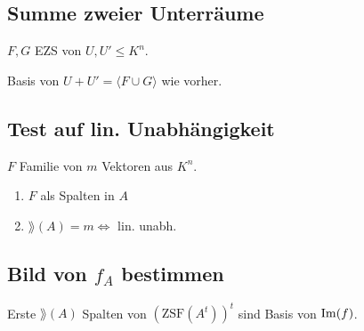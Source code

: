 \subsection*{Summe zweier Unterräume}
$F,G$ EZS von $U,U' \le K^n$.

Basis von $U+U'=\langle F \cup G \rangle$ wie vorher.

\subsection*{Test auf lin. Unabhängigkeit}
$F$ Familie von $m$ Vektoren aus $K^n$.

\begin{enumerate}
	\item $F$ als Spalten in $A$
	\item $\rang(A)=m \iff $ lin. unabh.
\end{enumerate}

\subsection*{Bild von $f_A$ bestimmen}
Erste $\rang(A)$ Spalten von $(\text{ZSF}(A^t))^t$ sind Basis von $\operatorname{Im}(f)$.
